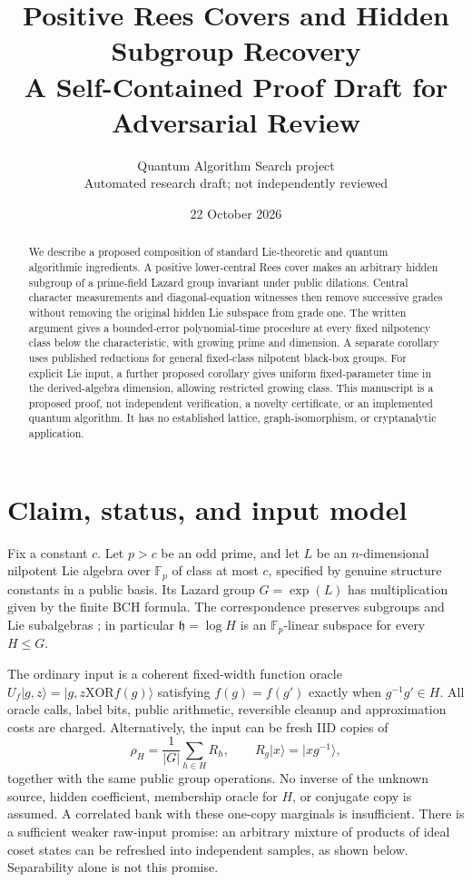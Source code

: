 \documentclass[11pt]{article}
\title{Positive Rees Covers and Hidden Subgroup Recovery\\
\large A Self-Contained Proof Draft for Adversarial Review}
\author{Quantum Algorithm Search project\\Automated research draft; not independently reviewed}
\date{22 October 2026}
\theoremstyle{remark}
\newcommand{\Fp}{\mathbb F_p}
\begin{document}
\maketitle
\begin{abstract}
We describe a proposed composition of standard Lie-theoretic and quantum
algorithmic ingredients. A positive lower-central Rees cover makes an
arbitrary hidden subgroup of a prime-field Lazard group invariant under
public dilations. Central character measurements and diagonal-equation
witnesses then remove successive grades without removing the original
hidden Lie subspace from grade one. The written argument gives a
bounded-error polynomial-time procedure at every fixed nilpotency class
below the characteristic, with growing prime and dimension. A separate
corollary uses published reductions for general fixed-class nilpotent
black-box groups. For explicit Lie input, a further proposed corollary gives
uniform fixed-parameter time in the derived-algebra dimension, allowing
restricted growing class. This manuscript is a proposed proof, not independent
verification, a novelty certificate, or an implemented quantum algorithm.
It has no established lattice, graph-isomorphism, or cryptanalytic application.
\end{abstract}

\section{Claim, status, and input model}
Fix a constant $c$. Let $p>c$ be an odd prime, and let $L$ be an
$n$-dimensional nilpotent Lie algebra over $\Fp$ of class at most $c$,
specified by genuine structure constants in a public basis. Its Lazard
group $G=\exp(L)$ has multiplication given by the finite BCH formula.
The correspondence preserves subgroups and Lie subalgebras
\cite[Section 2.3]{lazard}; in particular $\mathfrak h=\log H$ is an
$\Fp$-linear subspace for every $H\le G$.

The ordinary input is a coherent fixed-width function oracle
$U_f|g,z\rangle=|g,z\mathbin{\mathrm{XOR}} f(g)\rangle$ satisfying
$f(g)=f(g')$ exactly when $g^{-1}g'\in H$. All oracle calls, label bits,
public arithmetic, reversible cleanup and approximation costs are charged.
Alternatively, the input can be fresh IID copies of
\[
 \rho_H=\frac1{|G|}\sum_{h\in H}R_h,
 \qquad R_g|x\rangle=|xg^{-1}\rangle,
\]
together with the same public group operations. No inverse of the unknown
source, hidden coefficient, membership oracle for $H$, or conjugate copy
is assumed. A correlated bank with these one-copy marginals is insufficient.
There is a sufficient weaker raw-input promise: an arbitrary mixture of
products of ideal coset states can be refreshed into independent samples,
as shown below. Separability alone is not this promise.
\end{document}
